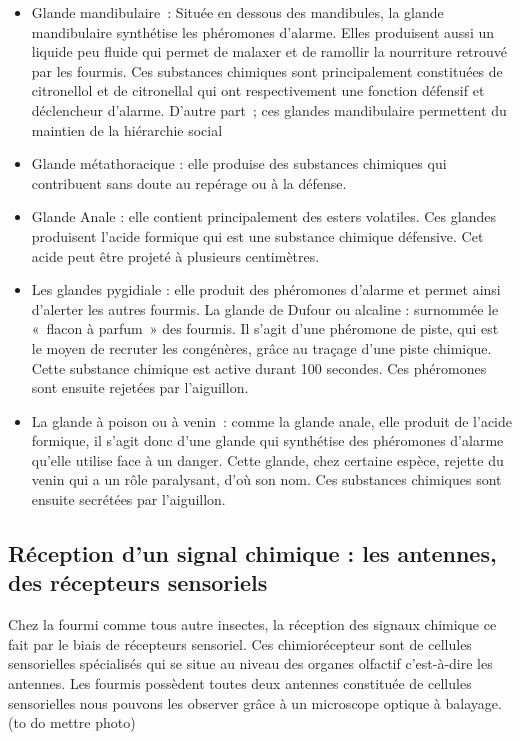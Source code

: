\begin{itemize}
\item
  Glande mandibulaire~: Située en dessous des mandibules, la glande
  mandibulaire synthétise les phéromones d'alarme. Elles produisent
  aussi un liquide peu fluide qui permet de malaxer et de ramollir la
  nourriture retrouvé par les fourmis. Ces substances chimiques sont
  principalement constituées de citronellol et de citronellal qui ont
  respectivement une fonction défensif et déclencheur d'alarme. D'autre
  part~; ces glandes mandibulaire permettent du maintien de la
  hiérarchie social
\item
  Glande métathoracique : elle produise des substances chimiques qui
  contribuent sans doute au repérage ou à la défense.
\item
  Glande Anale : elle contient principalement des esters volatiles. Ces
  glandes produisent l'acide formique qui est une substance chimique
  défensive. Cet acide peut être projeté à plusieurs centimètres.
\item
  Les glandes pygidiale : elle produit des phéromones d'alarme et permet
  ainsi d'alerter les autres fourmis. La glande de Dufour ou alcaline :
  surnommée le «~flacon à parfum~» des fourmis. Il s'agit d'une
  phéromone de piste, qui est le moyen de recruter les congénères, grâce
  au traçage d'une piste chimique. Cette substance chimique est active
  durant 100 secondes. Ces phéromones sont ensuite rejetées par
  l'aiguillon.
\item
  La glande à poison ou à venin~: comme la glande anale, elle produit de
  l'acide formique, il s'agit donc d'une glande qui synthétise des
  phéromones d'alarme qu'elle utilise face à un danger. Cette glande,
  chez certaine espèce, rejette du venin qui a un rôle paralysant, d'où
  son nom. Ces substances chimiques sont ensuite secrétées par
  l'aiguillon.
\end{itemize}

\subsection{Réception d'un signal chimique : les antennes, des récepteurs sensoriels}

Chez la fourmi comme tous autre insectes, la réception des signaux
chimique ce fait par le biais de récepteurs sensoriel. Ces
chimiorécepteur sont de cellules sensorielles spécialisés qui se situe
au niveau des organes olfactif c'est-à-dire les antennes. Les fourmis
possèdent toutes deux antennes constituée de cellules sensorielles nous
pouvons les observer grâce à un microscope optique à balayage. (to do
mettre photo)

